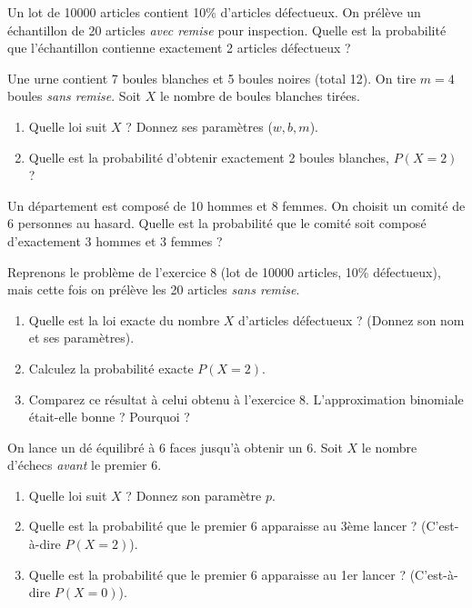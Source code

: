 \begin{exercicebox}
Un lot de 10000 articles contient 10\% d'articles défectueux. On prélève un échantillon de 20 articles \textit{avec remise} pour inspection.
Quelle est la probabilité que l'échantillon contienne exactement 2 articles défectueux ?
\end{exercicebox}


\begin{exercicebox}
Une urne contient 7 boules blanches et 5 boules noires (total 12). On tire $m=4$ boules \textit{sans remise}. Soit $X$ le nombre de boules blanches tirées.
\begin{enumerate}
    \item Quelle loi suit $X$ ? Donnez ses paramètres ($w, b, m$).
    \item Quelle est la probabilité d'obtenir exactement 2 boules blanches, $P(X=2)$ ?
\end{enumerate}
\end{exercicebox}

\begin{exercicebox}
Un département est composé de 10 hommes et 8 femmes. On choisit un comité de 6 personnes au hasard.
Quelle est la probabilité que le comité soit composé d'exactement 3 hommes et 3 femmes ?
\end{exercicebox}

\begin{exercicebox}
Reprenons le problème de l'exercice 8 (lot de 10000 articles, 10\% défectueux), mais cette fois on prélève les 20 articles \textit{sans remise}.
\begin{enumerate}
    \item Quelle est la loi exacte du nombre $X$ d'articles défectueux ? (Donnez son nom et ses paramètres).
    \item Calculez la probabilité exacte $P(X=2)$.
    \item Comparez ce résultat à celui obtenu à l'exercice 8. L'approximation binomiale était-elle bonne ? Pourquoi ?
\end{enumerate}
\end{exercicebox}


\begin{exercicebox}
On lance un dé équilibré à 6 faces jusqu'à obtenir un 6. Soit $X$ le nombre d'échecs \textit{avant} le premier 6.
\begin{enumerate}
    \item Quelle loi suit $X$ ? Donnez son paramètre $p$.
    \item Quelle est la probabilité que le premier 6 apparaisse au 3ème lancer ? (C'est-à-dire $P(X=2)$).
    \item Quelle est la probabilité que le premier 6 apparaisse au 1er lancer ? (C'est-à-dire $P(X=0)$).
\end{enumerate}
\end{exercicebox}

